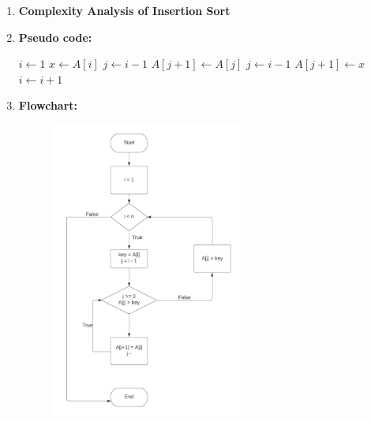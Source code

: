 \documentclass[11pt,a4paper]{article}
\begin{document}
{\begin{enumerate}[label=\textbf{\arabic*})]
				It works similar to the way you sort playing cards in your hands. The array is virtually split into a sorted and an unsorted part. Values from the unsorted part are picked and placed at the correct position in the sorted part.
				\\[12pt]
				\item \textbf{Complexity Analysis of Insertion Sort}
				\\[12pt]
				\item \textbf{Pseudo code:}
				
				\begin{algorithm}
					\begin{algorithmic}[1]
						\State $i \gets 1$
						\State $x \gets A[i]$
						\State $j \gets i - 1$ 
						\State $A[j+1] \gets A[j]$
						\State $j \gets i - 1$ 
						\EndWhile
						\State $A[j+1] \gets x$ 
						\State $i \gets i + 1$ 
						\EndWhile
						\EndProcedure
					\end{algorithmic}
				\end{algorithm}
				\pagebreak
				\item \textbf{Flowchart:}
					\begin{figure}[H]
						\centering 
						\includegraphics[width=0.6\textwidth]{Insertion Sort}
					\end{figure}
					

\end{enumerate}}
\end{document}
